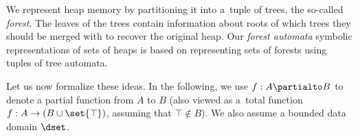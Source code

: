 {We represent heap memory by partitioning it into a~tuple of trees, the
so-called \emph{forest}.
The leaves of the trees contain information about roots of which trees they should be merged with to recover the original heap. 
Our \emph{forest automata} symbolic representations of sets of heaps is based
on representing sets of forests using tuples of tree automata.
%



Let us now formalize these ideas.
In the following, we use $f: A \partialto B$ to denote a partial function from
$A$ to $B$ (also
viewed as a~total function $f: A \to (B \cup \set{\top})$, assuming that $\top
\not\in B$).
We also assume a bounded data domain $\dset$. 

}
